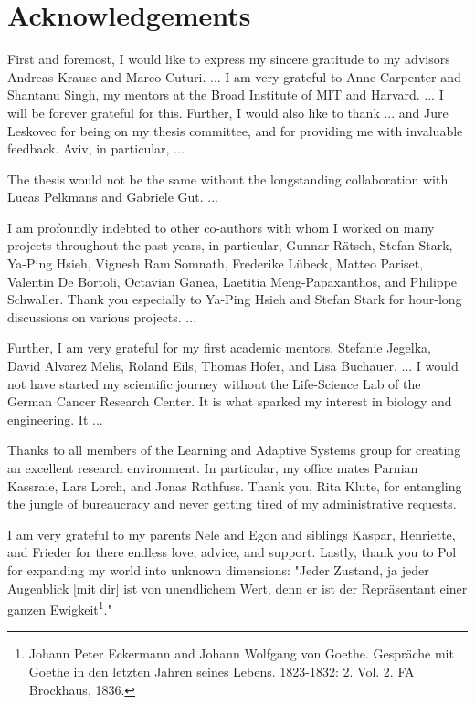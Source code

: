 
\bigskip

\begingroup
\let\clearpage\relax
\let\cleardoublepage\relax
\let\cleardoublepage\relax
\chapter*{Acknowledgements}

\def\thanks#1{%
\begingroup
\leftskip1em
\noindent #1
\par
\endgroup
}

First and foremost, I would like to express my sincere gratitude to my advisors Andreas Krause and Marco Cuturi.
...
I am very grateful to Anne Carpenter and Shantanu Singh, my mentors at the Broad Institute of MIT and Harvard. ... I will be forever grateful for this.
Further, I would also like to thank ... and Jure Leskovec for being on my thesis committee, and for providing me with invaluable feedback.
Aviv, in particular, ...

The thesis would not be the same without the longstanding collaboration with Lucas Pelkmans and Gabriele Gut. ...

I am profoundly indebted to other co-authors with whom I worked on many projects throughout the past years, in particular, Gunnar R\"atsch, Stefan Stark, Ya-Ping Hsieh, Vignesh Ram Somnath, Frederike L\"ubeck, Matteo Pariset, Valentin De Bortoli, Octavian Ganea, Laetitia Meng-Papaxanthos, and Philippe Schwaller. Thank you especially to Ya-Ping Hsieh and Stefan Stark for hour-long discussions on various projects. 
...

Further, I am very grateful for my first academic mentors, Stefanie Jegelka, David Alvarez Melis, Roland Eils, Thomas H\"ofer, and Lisa Buchauer. ...
I would not have started my scientific journey without the Life-Science Lab of the German Cancer Research Center. It is what sparked my interest in biology and engineering. It ...

Thanks to all members of the Learning and Adaptive Systems group for creating an excellent research environment. In particular, my office mates Parnian Kassraie, Lars Lorch, and Jonas Rothfuss. Thank you, Rita Klute, for entangling the jungle of bureaucracy and never getting tired of my administrative requests. 

I am very grateful to my parents Nele and Egon and siblings Kaspar, Henriette, and Frieder for there endless love, advice, and support.
Lastly, thank you to Pol for expanding my world into unknown dimensions: "Jeder Zustand, ja jeder Augenblick [mit dir] ist von unendlichem Wert, denn er ist der Repr{\"a}sentant einer ganzen Ewigkeit\footnote{Johann Peter Eckermann and Johann Wolfgang von Goethe. Gespr{\"a}che mit Goethe in den letzten Jahren seines Lebens. 1823-1832: 2. Vol. 2. FA Brockhaus, 1836.}."


\endgroup
